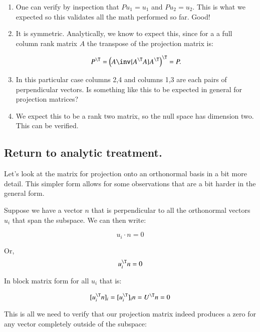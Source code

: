 \begin{enumerate}
\item
One can verify by inspection that $P u_1 = u_1$ and $P u_2 = u_2$.  This is what we expected
so this validates all the math performed so far.  Good!


\item
It is symmetric.  Analytically, we know to expect this, since for a 
a full column rank matrix $A$ the transpose of the projection matrix is:

\[
P^\T = {\left(A \inv{A^\T A} A^\T \right)}^\T = P.
\]

\item
In this particular case columns 2,4 and columns 1,3 are each pairs of
perpendicular vectors.  Is something like this to be expected in general for
projection matrices?

\item
We expect this to be a rank two matrix, so the null space has dimension two.  This can be verified.

\end{enumerate}

\subsection{Return to analytic treatment. }

Let's look at the matrix for projection onto an orthonormal basis in a bit more detail.  This simpler form allows for
some observations that are a bit harder in the general form.

Suppose we have a vector $n$ that is perpendicular to all the orthonormal vectors $u_i$ that span the subspace.  We can then write:

\[
u_i \cdot n = 0
\]

Or,
\[
u_i^\T n = 0
\]

In block matrix form for all $u_i$ that is:

\[
[u_i^\T n]_i = [u_i^\T]_i n = U^\T n = 0
\]

This is all we need to verify that our projection matrix indeed produces a zero for any vector completely outside of the subspace:


